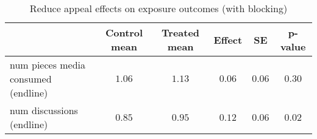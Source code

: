 \begin{table*}[ht]
\caption{Reduce appeal effects on exposure outcomes (with blocking)\label{round}} 
\begin{center}
\begin{tabular}{lccccc}
\hline\hline
\multicolumn{1}{l}{}&\multicolumn{1}{c}{Control mean}&\multicolumn{1}{c}{Treated mean}&\multicolumn{1}{c}{Effect}&\multicolumn{1}{c}{SE}&\multicolumn{1}{c}{p-value}\tabularnewline
\hline
num pieces media consumed (endline)&$1.06$&$1.13$&$0.06$&$0.06$&$0.30$\tabularnewline
num discussions (endline)&$0.85$&$0.95$&$0.12$&$0.06$&$0.02$\tabularnewline
\hline
\end{tabular}\end{center}

\end{table*}
